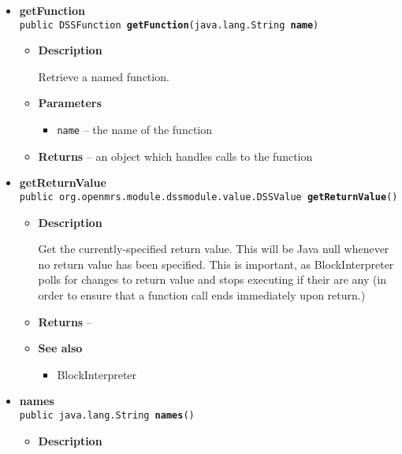 {{{{\begin{itemize}
{\begin{itemize}
{Get the evaluator appropriate to this execution context
}
\item{{\bf  Returns} -- 
 
}%
\end{itemize}
}%
\item{ 
\hypertarget{org.openmrs.module.dssmodule.state.ExecutionContext.getFunction(java.lang.String)}{{\bf  getFunction}\\}
\texttt{public DSSFunction\ {\bf  getFunction}(\texttt{java.lang.String} {\bf  name})
\label{org.openmrs.module.dssmodule.state.ExecutionContext.getFunction(java.lang.String)}}%
\begin{itemize}
\item{
{\bf  Description}

Retrieve a named function.
}
\item{
{\bf  Parameters}
  \begin{itemize}
   \item{
\texttt{name} -- the name of the function}
  \end{itemize}
}%
\item{{\bf  Returns} -- 
an object which handles calls to the function 
}%
\end{itemize}
}%
\item{ 
\hypertarget{org.openmrs.module.dssmodule.state.ExecutionContext.getReturnValue()}{{\bf  getReturnValue}\\}
\texttt{public org.openmrs.module.dssmodule.value.DSSValue\ {\bf  getReturnValue}()
\label{org.openmrs.module.dssmodule.state.ExecutionContext.getReturnValue()}}%
\begin{itemize}
\item{
{\bf  Description}

Get the currently-specified return value. This will be Java null whenever no return value has been specified. This is important, as BlockInterpreter polls for changes to return value and stops executing if their are any (in order to ensure that a function call ends immediately upon return.)
}
\item{{\bf  Returns} -- 
 
}%
\item{{\bf  See also}
  \begin{itemize}
\item{ BlockInterpreter}
  \end{itemize}
}%
\end{itemize}
}%
\item{ 
\hypertarget{org.openmrs.module.dssmodule.state.ExecutionContext.names()}{{\bf  names}\\}
\texttt{public java.lang.String\lbrack \rbrack \ {\bf  names}()
\label{org.openmrs.module.dssmodule.state.ExecutionContext.names()}}%
\begin{itemize}
\item{
{\bf  Description}

}
\end{itemize}}
\end{itemize}}}}}
